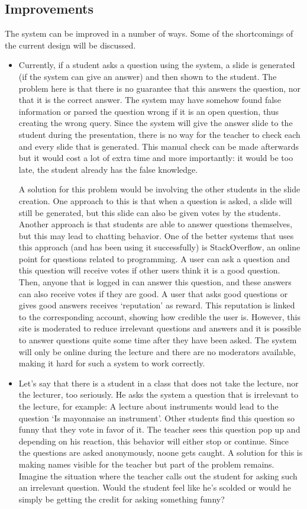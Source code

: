 \documentclass[11pt]{article}
\begin{document}
\subsection{Improvements}
The system can be improved in a number of ways. Some of the shortcomings of the current design will be discussed. 
\begin{itemize}
\item Currently, if a student asks a question using the system, a slide is generated (if the system can give an answer) and then shown to the student. The problem here is that there is no guarantee that this answers the question, nor that it is the correct answer. The system may have somehow found false information or parsed the question wrong if it is an open question, thus creating the wrong query. Since the system will give the answer slide to the student during the presentation, there is no way for the teacher to check each and every slide that is generated. This manual check can be made afterwards but it would cost a lot of extra time and more importantly: it would be too late, the student already has the false knowledge. 

A solution for this problem would be involving the other students in the slide creation. One approach to this is that when a question is asked, a slide will still be generated, but this slide can also be given votes by the students. Another approach is that students are able to answer questions themselves, but this may lead to chatting behavior. One of the better systems that uses this approach (and has been using it successfully) is StackOverflow, an online point for questions related to programming. A user can ask a question and this question will receive votes if other users think it is a good question. Then, anyone that is logged in can answer this question, and these answers can also receive votes if they are good. A user that asks good questions or gives good answers receives `reputation' as reward. This reputation is linked to the corresponding account, showing how credible the user is. However, this site is moderated to reduce irrelevant questions and answers and it is possible to answer questions quite some time after they have been asked. The system will only be online during the lecture and there are no moderators available, making it hard for such a system to work correctly. 

\item Let's say that there is a student in a class that does not take the lecture, nor the lecturer, too seriously. He asks the system a question that is irrelevant to the lecture, for example: A lecture about instruments would lead to the question ‘Is mayonnaise an instrument'. Other students find this question so funny that they vote in favor of it. The teacher sees this question pop up and depending on his reaction, this behavior will either stop or continue. Since the questions are asked anonymously, noone gets caught. A solution for this is making names visible for the teacher but part of the problem remains. Imagine the situation where the teacher calls out the student for asking such an irrelevant question. Would the student feel like he's scolded or would he simply be getting the credit for asking something funny? 


\end{itemize}
\end{document}
